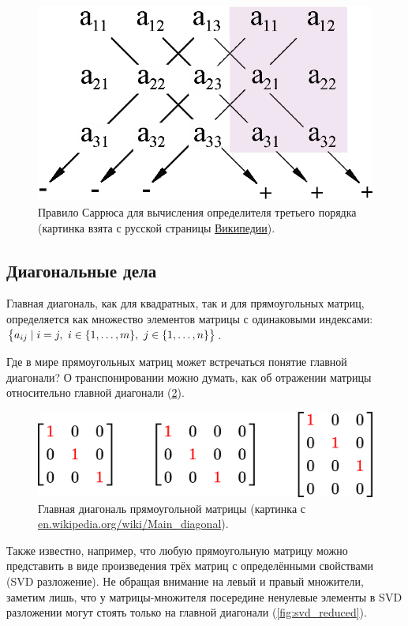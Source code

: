 \documentclass[a4paper,12pt]{article}
\begin{document}
  \begin{figure}[h]
    \centering
    
    \includegraphics[width=0.5\columnwidth]{determinant-sarrus}
    
    \caption{Правило Саррюса для вычисления определителя третьего порядка (картинка взята с русской страницы \href{https://upload.wikimedia.org/wikipedia/commons/1/17/Determinant-sarrus.svg}{Википедии}).}
    \label{fig:determinant-sarrus}
  \end{figure}
  
  
  \subsection{Диагональные дела}
  
  Главная диагональ, как для квадратных, так и для прямоугольных матриц, определяется как множество элементов матрицы с одинаковыми индексами: $\bigl\{a_{ij} \hm\mid i \hm= j,\ i \hm\in \{1, \ldots, m\},\ j \hm\in \{1, \ldots, n\}\bigr\}$.
  
  Где в мире прямоугольных матриц может встречаться понятие главной диагонали?
  О транспонировании можно думать, как об отражении матрицы относительно главной диагонали (\ref{fig:main-diagonal}).
  
  \begin{figure}[h]
    \centering
    
    \includegraphics[width=0.5\columnwidth]{main-diagonal}
    
    \caption{Главная диагональ прямоугольной матрицы (картинка с \href{https://en.wikipedia.org/wiki/Main\_diagonal}{en.wikipedia.org/wiki/Main\_diagonal}).}
    \label{fig:main-diagonal}
  \end{figure}
  
  Также известно, например, что любую прямоугольную матрицу можно представить в виде произведения трёх матриц с определёнными свойствами (SVD разложение).
  Не обращая внимание на левый и правый множители, заметим лишь, что у матрицы-множителя посередине ненулевые элементы в SVD разложении могут стоять только на главной диагонали (\ref{fig:svd_reduced}).
  
\end{document}
